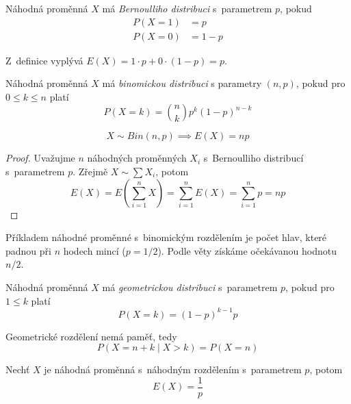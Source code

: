 \begin{definition}
    Náhodná proměnná $X$ má {\em Bernoulliho distribuci} s~parametrem
    $p$, pokud
    \begin{align*}
        P(X = 1) &= p  \\
        P(X = 0) &= 1 - p
    \end{align*}
\end{definition}

Z~definice vyplývá $E(X) = 1 \cdot p + 0 \cdot (1-p) = p$.

\begin{definition}
    Náhodná proměnná $X$ má {\em binomickou distribuci} s parametry $(n, p)$,
    pokud pro $0 \leq k \leq n$ platí
\[
    P(X = k) = {{n} \choose {k}} p^k (1 - p)^{n - k}
\]
\end{definition}

\begin{theorem}
    \[
        X \sim Bin(n,p) \implies E(X) = np
    \]
\end{theorem}

\begin{proof}
    Uvažujme $n$ náhodných proměnných $X_i$ s~Bernoulliho distribucí
    s~parametrem $p$.
    Zřejmě $X \sim \sum X_i$, potom
    \[
        E(X) = E( \sum_{i = 1}^{n} X )
             = \sum_{i = 1}^{n} E(X)
             = \sum_{i = 1}^{n} p
             = n p
    \]
\end{proof}

\begin{example}
    Příkladem náhodné proměnné s~binomickým rozdělením je
    počet hlav, které padnou při $n$ hodech mincí ($p = 1/2$).
    Podle věty získáme očekávanou hodnotu $n/2$.
\end{example}

\begin{definition}
    Náhodná proměnná $X$ má {\em geometrickou distribuci} s~parametrem
    $p$, pokud pro $1 \leq k$ platí
\[
    P(X = k) = (1-p)^{k-1} p
\]
\end{definition}

\begin{claim}
    Geometrické rozdělení nemá paměť, tedy
    \[
        P(X = n + k \mid X > k) = P(X = n)
    \]
\end{claim}

\begin{theorem}
    Nechť $X$ je náhodná proměnná s~náhodným rozdělením s~parametrem
    $p$, potom
    \[
        E(X) = \frac{1}{p}
    \]
\end{theorem}

